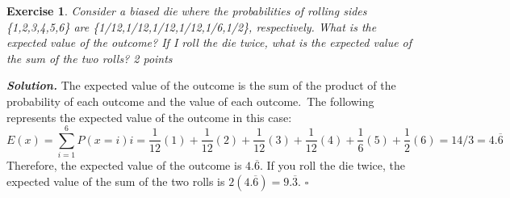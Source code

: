 \documentclass[12pt]{article}
\newtheorem{exercise}{Exercise}
\newenvironment{solution}[1][\it{Solution}]{\textbf{#1. } }{$\square$}
\begin{document}
\begin{exercise}
Consider a biased die where the probabilities of rolling sides \{1,2,3,4,5,6\} are \{1/12,1/12,1/12,1/12,1/6,1/2\}, respectively. What is the expected value of the outcome? If I roll the die twice, what is the expected value of the sum of the two rolls? 2 points
\end{exercise}
\begin{solution}
The expected value of the outcome is the sum of the product of the probability of each outcome and the value of each outcome.\
The following represents the expected value of the outcome in this case:
\begin{equation}
E(x) = \sum_{i = 1}^{6}P(x = i)i = \frac{1}{12}(1) + \frac{1}{12}(2) + \frac{1}{12}(3) + \frac{1}{12}(4) + \frac{1}{6}(5) + \frac{1}{2}(6) = 14/3 = 4.\overline{6}
\end{equation}
Therefore, the expected value of the outcome is $4.\overline{6}$. If you roll the die twice, the expected value of the sum of the two rolls is $2(4.\overline{6}) = 9.\overline{3}$.
\end{solution}
\end{document}
